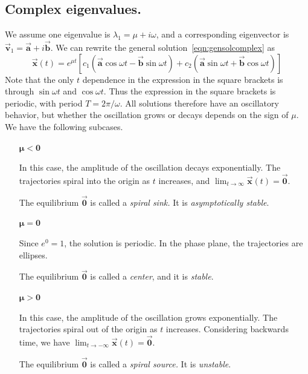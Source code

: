 \documentclass[reqno]{immbook}
\newcommand{\BA}{\vec{\textbf{a}}}
\newcommand{\BB}{\vec{\textbf{b}}}
\newcommand{\BV}{\vec{\textbf{v}}}
\newcommand{\BX}{\vec{\textbf{x}}}
\newcommand{\BZero}{\vec{\textbf{0}}}  %
\newcommand{\ds}{\displaystyle}
\numberwithin{equation}{chapter}
\numberwithin{question}{section}
\numberwithin{theorem}{chapter}
\numberwithin{figure}{chapter}
\theoremstyle{definition}
\begin{document}
\subsection*{Complex eigenvalues.}
We assume one eigenvalue is $\lambda_1 = \mu + i\omega$,
and a corresponding eigenvector is
$\BV_1 = \BA+i\BB$.
We can rewrite the general solution~\eqref{eqn:gensolcomplex}
as
\begin{equation}
\BX(t) = 
     e^{\mu t} \left[ c_1 \left(\BA\cos\omega t - \BB\sin\omega t \right)
         + c_2 \left(\BA\sin\omega t + \BB\cos\omega t\right)\right]
\end{equation}
Note that the only $t$ dependence in the expression in the square
brackets is through $\sin\omega t$ and $\cos\omega t$.
Thus the expression in the square brackets is periodic, with
period $T = 2\pi/\omega$.
All solutions therefore have an oscillatory behavior, 
but whether the oscillation grows or decays depends on the
sign of $\mu$.
We have the following subcases.
\begin{enumerate}

\item[$\pmb{\mu < 0}$]

In this case, the amplitude of the oscillation decays
exponentially.
The trajectories spiral into the origin as $t$ increases,
and $\ds\lim_{t\rightarrow\infty} \BX(t) = \BZero$.

\noindent
The equilibrium $\BZero$ is called a \emph{spiral sink.}
It is \emph{asymptotically stable}.

\smallskip

\item[$\pmb{\mu = 0}$]

Since $e^{0}=1$, the solution is periodic.
In the phase plane, the trajectories are ellipses.

\noindent
The equilibrium $\BZero$ is called a \emph{center}, and it is
\emph{stable}.

\smallskip

\item[$\pmb{\mu > 0}$]

In this case, the amplitude of the oscillation grows
exponentially.
The trajectories spiral out of the origin as $t$ increases.
Considering backwards time, we have
$\ds \lim_{t\rightarrow-\infty} \BX(t) = \BZero$.

\noindent
The equilibrium $\BZero$ is called a \emph{spiral source.}
It is \emph{unstable}.
\end{enumerate}
\end{document}
